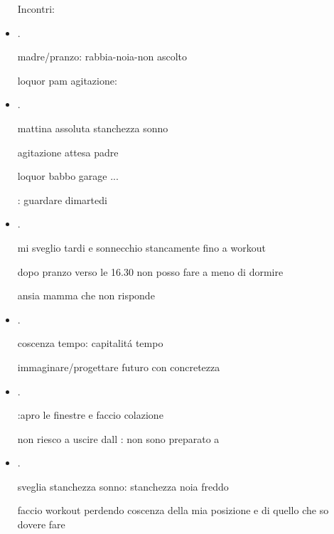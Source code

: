\begin{itemize}
Incontri: 



\item {}.

madre/pranzo: rabbia-noia-non ascolto

loquor pam agitazione: 

\item {}.

mattina assoluta stanchezza sonno

agitazione attesa padre

loquor babbo garage ...

: guardare dimartedi

\item {}.

mi sveglio tardi e sonnecchio stancamente fino a workout

dopo pranzo verso le 16.30 non posso fare a meno di dormire

ansia mamma che non risponde

\item {}.

coscenza tempo: capitalit\'a tempo


immaginare/progettare futuro con concretezza


\item {}.

:apro le finestre e faccio colazione

non riesco a uscire dall : non sono preparato a 


\item {}.

sveglia stanchezza sonno: stanchezza noia freddo 

faccio workout perdendo coscenza della mia posizione e di quello che so dovere fare


\end{itemize}
